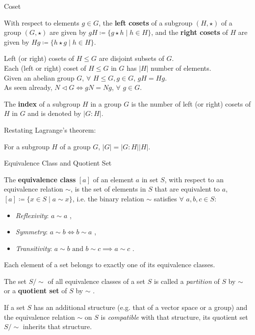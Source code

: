 \documentclass{beamer}
\newcommand\boldtext[1]{\textcolor{bolds}{\textbf{#1}}}
\newcommand\italictext[1]{\textcolor{italics}{\textit{#1}}}
\begin{document}
\begin{frame}{Coset}
    \begin{definition}
        With respect to elements $g\in G$, the \boldtext{left cosets} of a subgroup $(H,\star)$ of a group $(G,\star)$ are given by $gH\coloneqq\{g\star h\mid h\in H\}$, and the \boldtext{right cosets} of $H$ are given by $Hg\coloneqq\{h\star g\mid h\in H\}$.
    \end{definition}
    Left (or right) cosets of $H\leq G$ are disjoint subsets of $G$.\\ 
    Each (left or right) coset of $H\leq G$ in $G$ has $\lvert H\rvert$ number of elements.\\
    Given an abelian group $G$, $\forall$ $H\leq G,g\in G$, $gH=Hg$.\\
    As seen already, $N\vartriangleleft G\iff gN=Ng$, $\forall$ $g\in G$.
    \begin{definition}
        The \boldtext{index} of a subgroup $H$ in a group $G$ is the number of left (or right) cosets of $H$ in $G$ and is denoted by $\lvert G:H\rvert$.
    \end{definition}
    Restating Lagrange's theorem:
    \begin{theorem}
        For a subgroup $H$ of a group $G$, $\lvert G\rvert=\lvert G:H\rvert\lvert H\rvert$.
    \end{theorem}
\end{frame}

\begin{frame}{Equivalence Class and Quotient Set}
    \begin{definition}
        The \boldtext{equivalence class} $[a]$ of an element $a$ in set $S$, with respect to an equivalence relation $\sim$, is the set of elements in $S$ that are equivalent to $a$, $[a]\coloneqq\{x\in S\mid a\sim x\}$, i.e. the binary relation $\sim$ satisfies $\forall$ $a,b,c\in S$:
        \begin{itemize}
            \item \italictext{Reflexivity}: $a\sim a$ ,
            \item \italictext{Symmetry}: $a\sim b\iff b\sim a$ ,
            \item \italictext{Transitivity}: $a\sim b\text{ and }b\sim c\implies a\sim c$ .
        \end{itemize}
    \end{definition}
    Each element of a set belongs to exactly one of its equivalence classes.
    \begin{definition}
        The set $S/{\sim}$ of all equivalence classes of a set $S$ is called a \italictext{partition} of $S$ by $\sim$ or a \boldtext{quotient set} of $S$ by $\sim$ .
    \end{definition}
    If a set $S$ has an additional structure (e.g. that of a vector space or a group) and the equivalence relation $\sim$ on $S$ is \italictext{compatible} with that structure, its quotient set $S/{\sim}$ inherits that structure.
\end{frame}
\end{document}
